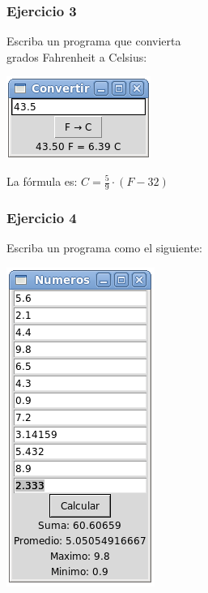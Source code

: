 \documentclass[12pt]{beamer}
\begin{document}
  \begin{frame}
    \frametitle{Ejercicio 3}
    Escriba un programa que convierta  \\
    grados Fahrenheit a Celsius:
    \vfill

    \includegraphics[width=.5\textwidth]{programas/tkinter/capturas/08.png}
    \vfill

    La fórmula es:
    \(
      \displaystyle
      C = \frac{5}{9}\cdot(F - 32)
    \)
  \end{frame}

  \begin{frame}
    \frametitle{Ejercicio 4}
    Escriba un programa como el siguiente:
    \vfill

    \includegraphics[width=.3\textwidth]{programas/tkinter/capturas/09.png}

  \end{frame}
\end{document}
